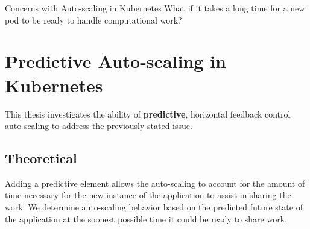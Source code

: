 \documentclass{beamer}
\begin{document}
\begin{frame}{Concerns with Auto-scaling in Kubernetes}
  What if it takes a long time for a new pod to be ready to handle computational
  work?

\end{frame}

\section{Predictive Auto-scaling in Kubernetes}

This thesis investigates the ability of \textbf{predictive}, horizontal feedback
control auto-scaling to address the previously stated issue.

\subsection{Theoretical}

Adding a predictive element allows the auto-scaling to account for the amount of
time necessary for the new instance of the application to assist in sharing the
work. We determine auto-scaling behavior based on the predicted future state of
the application at the soonest possible time it could be ready to share work.


\end{document}
